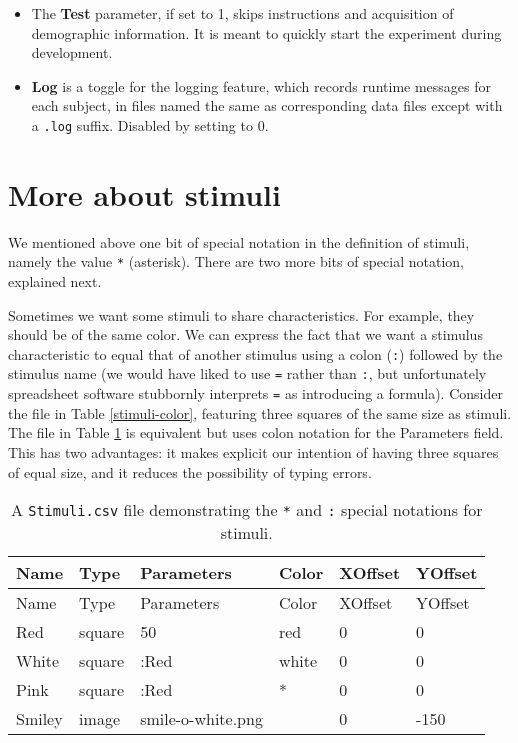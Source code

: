 \documentclass[11pt,]{article}
\begin{document}
\begin{itemize}
\item
  The \textbf{Test} parameter, if set to 1, skips instructions and
  acquisition of demographic information. It is meant to quickly start
  the experiment during development.
\item
  \textbf{Log} is a toggle for the logging feature, which records
  runtime messages for each subject, in files named the same as
  corresponding data files except with a \texttt{.log} suffix. Disabled
  by setting to 0.
\end{itemize}

\section{More about stimuli}\label{more-about-stimuli}

We mentioned above one bit of special notation in the definition of
stimuli, namely the value \texttt{*} (asterisk). There are two more bits
of special notation, explained next.

Sometimes we want some stimuli to share characteristics. For example,
they should be of the same color. We can express the fact that we want a
stimulus characteristic to equal that of another stimulus using a colon
(\texttt{:}) followed by the stimulus name (we would have liked to use
\texttt{=} rather than \texttt{:}, but unfortunately spreadsheet
software stubbornly interprets \texttt{=} as introducing a formula).
Consider the file in Table \ref{stimuli-color}, featuring three squares
of the same size as stimuli. The file in Table \ref{stimuli-special} is
equivalent but uses colon notation for the Parameters field. This has
two advantages: it makes explicit our intention of having three squares
of equal size, and it reduces the possibility of typing errors.

\begin{longtable}[c]{@{}llllll@{}}
\caption{A \texttt{Stimuli.csv} file demonstrating the \texttt{*} and
\texttt{:} special notations for stimuli.
\label{stimuli-special}}\tabularnewline
\toprule
Name & Type & Parameters & Color & XOffset & YOffset\tabularnewline
\midrule
\endfirsthead
\toprule
Name & Type & Parameters & Color & XOffset & YOffset\tabularnewline
\midrule
\endhead
Red & square & 50 & red & 0 & 0\tabularnewline
White & square & :Red & white & 0 & 0\tabularnewline
Pink & square & :Red & * & 0 & 0\tabularnewline
Smiley & image & smile-o-white.png & & 0 & -150\tabularnewline
\bottomrule
\end{longtable}
\end{document}
